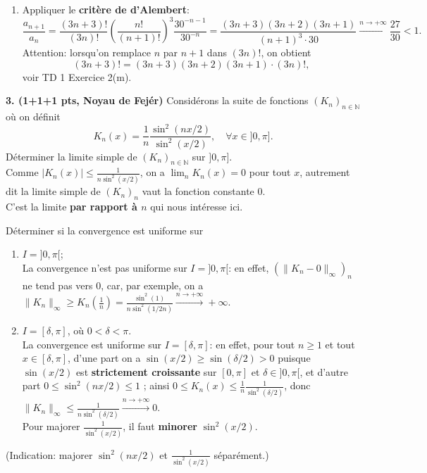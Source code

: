 \documentclass[a4paper,10pt]{article}
\newcommand{\N}{\mathbb{N}}
\newcommand{\norm}[1]{\|#1\|}
\newcommand{\abs}[1]{\left|#1\right|}
\newcommand{\correction}[1]{{\color{red}#1}}
\newcommand{\comment}[1]{{\color{blue}#1}}
\begin{document}
{\begin{enumerate}[label=\alph*)]
{    Dans le critère de d'Alembert, c'est la \textbf{limite} de $\frac{a_{n+1}}{a_n}$ quand $n\to+\infty$ qu'il faut vérifier à être $<1$.}
    \item Appliquer le \textbf{critère de d'Alembert}:
    $$\frac{a_{n+1}}{a_n}=\frac{(3n+3)!}{(3n)!}\left(\frac{n!}{(n+1)!}\right)^3\frac{30^{-n-1}}{30^{-n}}=\frac{(3n+3)(3n+2)(3n+1)}{(n+1)^3\cdot 30}\xrightarrow{n\to+\infty}\frac{27}{30}<1.$$
    \comment{Attention: lorsqu'on remplace $n$ par $n+1$ dans $(3n)!$, on obtient
    $$(3n+3)!=(3n+3)(3n+2)(3n+1)\cdot (3n)!,$$
    voir TD 1 Exercice 2(m).}
\end{enumerate}
}

\vspace{.1in}

\noindent
\textbf{3. (1+1+1 pts, Noyau de Fejér)} Considérons la suite de fonctions $(K_n)_{n\in\N}$ où on définit
$$K_n(x)=\frac{1}{n}\frac{\sin^2(nx/2)}{\sin^2(x/2)},\quad\forall x\in]0,\pi].$$
Déterminer la limite simple de $(K_n)_{n\in\N}$ sur $]0,\pi]$.\\
\correction{Comme $\abs{K_n(x)}\leq\frac{1}{n\sin^2(x/2)}$, on a $\lim_nK_n(x)=0$ pour tout $x$, autrement dit la limite simple de $(K_n)_n$ vaut la fonction constante 0.}\\
\comment{C'est la limite \textbf{par rapport à $n$} qui nous intéresse ici.}

Déterminer si la convergence est uniforme sur
\begin{enumerate}[label=\alph*)]
    \item $I=]0,\pi[$;\\
    \correction{La convergence n'est pas uniforme sur $I=]0,\pi[$: en effet, $(\norm{K_n-0}_\infty)_n$ ne tend pas vers 0, car, par exemple, on a $\norm{K_n}_\infty\geq K_n(\frac{1}{n})=\frac{\sin^2(1)}{n\sin^2(1/2n)}\xrightarrow{n\to+\infty}+\infty$.}
    \item $I=[\delta,\pi]$, où $0<\delta<\pi$.\\
    \correction{La convergence est uniforme sur $I=[\delta,\pi]$: en effet, pour tout $n\geq1$ et tout $x\in[\delta,\pi]$, d'une part on a $\sin(x/2)\geq\sin(\delta/2)>0$ puisque $\sin(x/2)$ est \textbf{strictement croissante} sur $[0,\pi]$ et $\delta\in]0,\pi[$, et d'autre part $0\leq \sin^2(nx/2)\leq1$ ; ainsi $0\leq K_n(x)\leq\frac{1}{n}\frac{1}{\sin^2(\delta/2)}$, donc $\norm{K_n}_\infty\leq\frac{1}{n\sin^2(\delta/2)}\xrightarrow{n\to+\infty}0$.}\\
    \comment{Pour majorer $\frac{1}{\sin^2(x/2)}$, il faut \textbf{minorer} $\sin^2(x/2)$.}
\end{enumerate}
(Indication: majorer $\sin^2(nx/2)$ et $\frac{1}{\sin^2(x/2)}$ séparément.)\\
\end{document}
